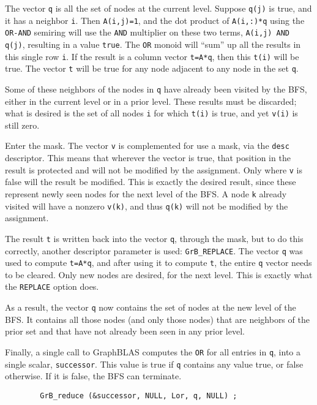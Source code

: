 \documentclass[12pt]{article}
\begin{document}
The vector \verb'q' is all the set of nodes at the current level.  Suppose
\verb'q(j)' is true, and it has a neighbor \verb'i'.  Then \verb'A(i,j)=1', and
the dot product of \verb'A(i,:)*q' using the \verb'OR-AND' semiring will use
the \verb'AND' multiplier on these two terms, \verb'A(i,j) AND q(j)', resulting
in a value \verb'true'.  The \verb'OR' monoid will ``sum'' up all the results
in this single row \verb'i'.  If the result is a column vector \verb't=A*q',
then this \verb't(i)' will be true.  The vector \verb't' will be true for
any node adjacent to any node in the set \verb'q'.

Some of these neighbors of the nodes in \verb'q' have already been visited by
the BFS, either in the current level or in a prior level.  These results must
be discarded; what is desired is the set of all nodes \verb'i' for which
\verb't(i)' is true, and yet \verb'v(i)' is still zero.

Enter the mask.  The vector \verb'v' is complemented for use a mask, via the
\verb'desc' descriptor.  This means that wherever the vector is true, that
position in the result is protected and will not be modified by the assignment.
Only where \verb'v' is false will the result be modified.  This is exactly the
desired result, since these represent newly seen nodes for the next level of
the BFS.  A node \verb'k' already visited will have a nonzero \verb'v(k)', and
thus \verb'q(k)' will not be modified by the assignment.

The result \verb't' is written back into the vector \verb'q', through the mask,
but to do this correctly, another descriptor parameter is used:
\verb'GrB_REPLACE'.  The vector \verb'q' was used to compute \verb't=A*q', and
after using it to compute \verb't', the entire \verb'q' vector needs to be
cleared.  Only new nodes are desired, for the next level.  This is exactly what
the \verb'REPLACE' option does.

As a result, the vector \verb'q' now contains the set of nodes at the new
level of the BFS.  It contains all those nodes (and only those nodes)
that are neighbors of the prior set and that have not already been seen in
any prior level.

Finally, a single call to GraphBLAS computes the \verb'OR' for all entries
in \verb'q', into a single scalar, \verb'successor'.  This value is true if
\verb'q' contains any value true, or false otherwise.  If it is false,
the BFS can terminate.

        {\footnotesize
        \begin{verbatim}
        GrB_reduce (&successor, NULL, Lor, q, NULL) ; \end{verbatim}}
\end{document}
